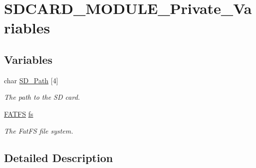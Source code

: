 \hypertarget{group___s_d_c_a_r_d___m_o_d_u_l_e___private___variables}{}\section{S\+D\+C\+A\+R\+D\+\_\+\+M\+O\+D\+U\+L\+E\+\_\+\+Private\+\_\+\+Variables}
\label{group___s_d_c_a_r_d___m_o_d_u_l_e___private___variables}
\subsection*{Variables}
\begin{DoxyCompactItemize}
\item 
\mbox{\label{group___s_d_c_a_r_d___m_o_d_u_l_e___private___variables_ga37efc360033863352a8678e12c56d977}} 
char \hyperlink{group___s_d_c_a_r_d___m_o_d_u_l_e___private___variables_ga37efc360033863352a8678e12c56d977}{S\+D\+\_\+\+Path} \mbox{[}4\mbox{]}
\begin{DoxyCompactList}\small\item\em The path to the SD card. \end{DoxyCompactList}\item 
\mbox{\label{group___s_d_c_a_r_d___m_o_d_u_l_e___private___variables_gae5bcde72e0e0b29ec86d00ba3e5cd51f}} 
\hyperlink{struct_f_a_t_f_s}{F\+A\+T\+FS} \hyperlink{group___s_d_c_a_r_d___m_o_d_u_l_e___private___variables_gae5bcde72e0e0b29ec86d00ba3e5cd51f}{fs}
\begin{DoxyCompactList}\small\item\em The Fat\+FS file system. \end{DoxyCompactList}\end{DoxyCompactItemize}


\subsection{Detailed Description}
